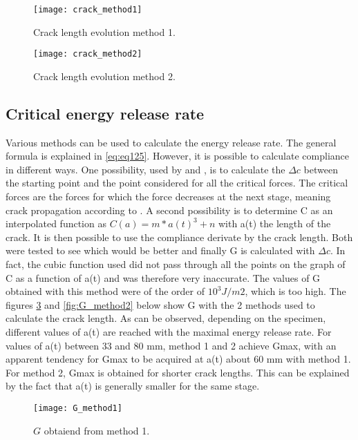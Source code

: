 \begin{figure}[htp]
	\centering
	\texttt{[image: crack\_method1]}
	\caption{Crack length evolution method 1.}
	\label{fig:crack_method1}
\end{figure}

\begin{figure}[htp]
	\centering
	\texttt{[image: crack\_method2]}
	\caption{Crack length evolution method 2.}
	\label{fig:crack_method2}
\end{figure}

\subsection{Critical energy release rate}

Various methods can be used to calculate the energy release rate. The general formula is explained in \ref{eq:eq125}. However, it is possible to calculate compliance in different ways. One possibility, used by \cite{MALFAIT2021} and \cite{MoutouPitti2008}, is to calculate the $\Delta c$ between the starting point and the point considered for all the critical forces. The critical forces are the forces for which the force decreases at the next stage, meaning crack propagation according to \cite{MoutouPitti2008}. A second possibility is to determine C as an interpolated function as $C(a)=m*a(t)^3+n$ with a(t) the length of the crack.  It is then possible to use the compliance derivate by the crack length. Both were tested to see which would be better and finally G is calculated with $\Delta c$. In fact, the cubic function used did not pass through all the points on the graph of C as a function of a(t) and was therefore very inaccurate. The values of G obtained with this method were of the order of $10^3 J/m2$, which is too high.
The figures \ref{fig:G_method1} and \ref{fig:G_method2} below show G with the 2 methods used to calculate the crack length.
As can be observed, depending on the specimen, different values of a(t) are reached with the maximal energy release rate. For values of a(t) between 33 and 80 mm, method 1 and 2 achieve Gmax, with an apparent tendency for Gmax to be acquired at a(t) about 60 mm with method 1. For method 2, Gmax is obtained for shorter crack lengths. This can be explained by the fact that a(t) is generally smaller for the same stage.

\begin{figure}[htp]
	\centering
	\texttt{[image: G\_method1]}
	\caption{$G$ obtaiend from method 1.}
	\label{fig:G_method1}
\end{figure}

